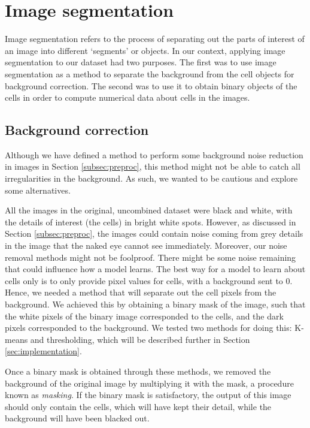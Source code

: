 \section{Image segmentation}

Image segmentation refers to the process of separating out the parts of interest of an image into different `segments' or objects. In our context, applying image segmentation to our dataset had two purposes. The first was to use image segmentation as a method to separate the background from the cell objects for background correction. The second was to use it to obtain binary objects of the cells in order to compute numerical data about cells in the images.

\subsection{Background correction} \label{subsec:correction}

Although we have defined a method to perform some background noise reduction in images in Section \ref{subsec:preproc}, this method might not be able to catch all irregularities in the background. As such, we wanted to be cautious and explore some alternatives.

All the images in the original, uncombined dataset were black and white, with the details of interest (the cells) in bright white spots. However, as discussed in Section \ref{subsec:preproc}, the images could contain noise coming from grey details in the image that the naked eye cannot see immediately. Moreover, our noise removal methods might not be foolproof. There might be some noise remaining that could influence how a model learns. The best way for a model to learn about cells only is to only provide pixel values for cells, with a background sent to 0. Hence, we needed a method that will separate out the cell pixels from the background. We achieved this by obtaining a binary mask of the image, such that the white pixels of the binary image corresponded to the cells, and the dark pixels corresponded to the background. We tested two methods for doing this: K-means and thresholding, which will be described further in Section \ref{sec:implementation}.

Once a binary mask is obtained through these methods, we removed the background of the original image by multiplying it with the mask, a procedure known as \textit{masking}. If the binary mask is satisfactory, the output of this image should only contain the cells, which will have kept their detail, while the background will have been blacked out.

